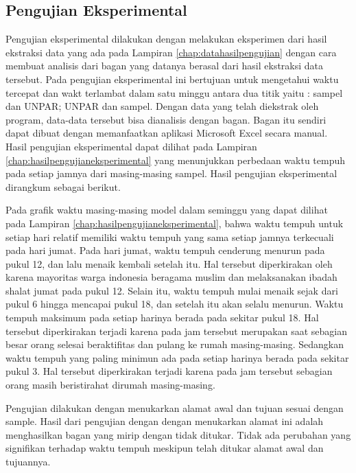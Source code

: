 \subsection{Pengujian Eksperimental}
\label{subsec:pengujianeksperimental}
Pengujian eksperimental dilakukan dengan melakukan eksperimen dari hasil ekstraksi data yang ada pada Lampiran \ref{chap:datahasilpengujian} dengan cara membuat analisis dari bagan yang datanya berasal dari hasil ekstraksi data tersebut. Pada pengujian eksperimental ini bertujuan untuk mengetahui waktu tercepat dan wakt terlambat dalam satu minggu antara dua titik yaitu : sampel dan UNPAR; UNPAR dan sampel. Dengan data yang telah diekstrak oleh program, data-data tersebut bisa dianalisis dengan bagan. Bagan itu sendiri dapat dibuat dengan memanfaatkan aplikasi Microsoft Excel secara manual. Hasil pengujian eksperimental dapat dilihat pada Lampiran \ref{chap:hasilpengujianeksperimental} yang menunjukkan perbedaan waktu tempuh pada setiap jamnya dari masing-masing sampel. Hasil pengujian eksperimental dirangkum sebagai berikut.

Pada grafik waktu masing-masing model dalam seminggu yang dapat dilihat pada Lampiran \ref{chap:hasilpengujianeksperimental}, bahwa waktu tempuh untuk setiap hari relatif memiliki waktu tempuh yang sama setiap jamnya terkecuali pada hari jumat. Pada hari jumat, waktu tempuh cenderung menurun pada pukul 12, dan lalu menaik kembali setelah itu. Hal tersebut diperkirakan oleh karena mayoritas warga indonesia beragama muslim dan melaksanakan ibadah shalat jumat pada pukul 12. Selain itu, waktu tempuh mulai menaik sejak dari pukul 6 hingga mencapai pukul 18, dan setelah itu akan selalu menurun. Waktu tempuh maksimum pada setiap harinya berada pada sekitar pukul 18. Hal tersebut diperkirakan terjadi karena pada jam tersebut merupakan saat sebagian besar orang selesai beraktifitas dan pulang ke rumah masing-masing. Sedangkan waktu tempuh yang paling minimun ada pada setiap harinya berada pada sekitar pukul 3. Hal tersebut diperkirakan terjadi karena pada jam tersebut sebagian orang masih beristirahat dirumah masing-masing.

Pengujian dilakukan dengan menukarkan alamat awal dan tujuan sesuai dengan sample. Hasil dari pengujian dengan dengan menukarkan alamat ini adalah menghasilkan bagan yang mirip dengan tidak ditukar. Tidak ada perubahan yang signifikan terhadap waktu tempuh meskipun telah ditukar alamat awal dan tujuannya.